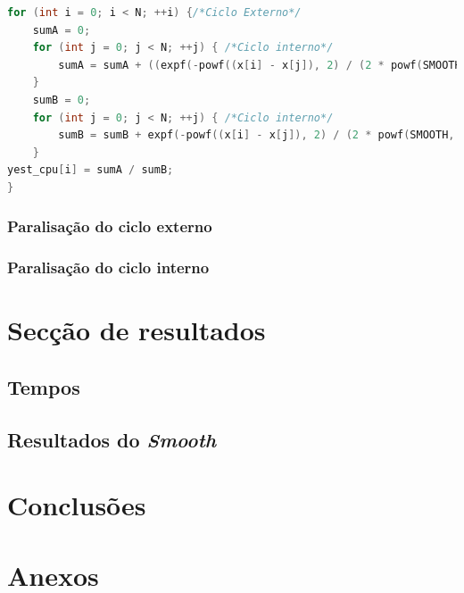 \documentclass[11pt]{article}
\numberwithin{equation}{section}
\begin{document}
\begin{lstlisting}[language=C]
for (int i = 0; i < N; ++i) {/*Ciclo Externo*/
	sumA = 0;
	for (int j = 0; j < N; ++j) { /*Ciclo interno*/
		sumA = sumA + ((expf(-powf((x[i] - x[j]), 2) / (2 * powf(SMOOTH, 2)))) * y[j]);
	}
	sumB = 0;
	for (int j = 0; j < N; ++j)	{ /*Ciclo interno*/
		sumB = sumB + expf(-powf((x[i] - x[j]), 2) / (2 * powf(SMOOTH, 2)));
	}
yest_cpu[i] = sumA / sumB;
}
\end{lstlisting}
 
\subsubsection{Paralisação do ciclo externo}
\subsubsection{Paralisação do ciclo interno}


\section{Secção de resultados}
\subsection{Tempos}
\subsection{Resultados do \textit{Smooth}}

\section{Conclusões}
\section{Anexos}
\end{document}
